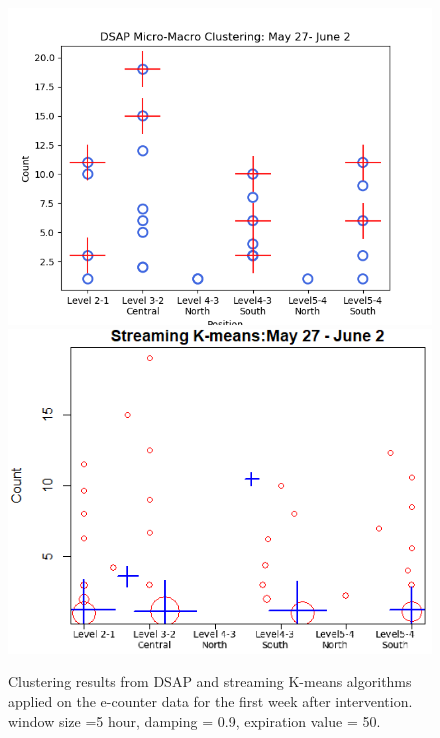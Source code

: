 \begin{figure}[]
    \centering
    \includegraphics[width=.49\textwidth]{image/Chapters/Chapter6/After5hour-samp 9.preference 4.No Thre.png}
    \includegraphics[width=.49\textwidth]{image/Chapters/Chapter6/StreamKAfter.png}
    \caption{Clustering results from DSAP and streaming K-means algorithms applied on the e-counter data for the first week after intervention. window size =5 hour, damping = 0.9, expiration value = 50.}
    \label{36}
\end{figure}



